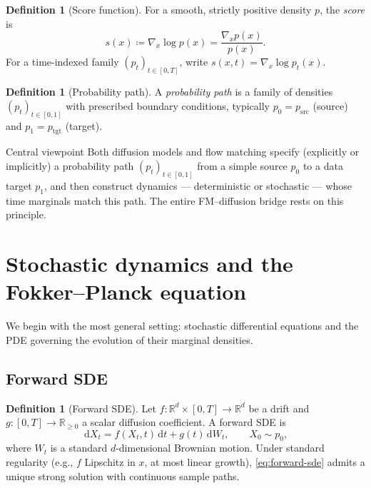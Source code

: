 \documentclass[11pt]{article}
\newcommand{\R}{\mathbb{R}}
\newcommand{\grad}{\nabla}
\newcommand{\dd}{\,\mathrm{d}}
\theoremstyle{definition}
\newtheorem{definition}[theorem]{Definition}
\theoremstyle{remark}
\begin{document}
\begin{definition}[Score function]
For a smooth, strictly positive density $p$, the \emph{score} is
\[
s(x) \coloneqq \grad_x \log p(x) = \frac{\grad_x p(x)}{p(x)}.
\]
For a time-indexed family $(p_t)_{t\in[0,T]}$, write $s(x,t) = \grad_x \log p_t(x)$.
\end{definition}

\begin{definition}[Probability path]
A \emph{probability path} is a family of densities $(p_t)_{t\in[0,1]}$ with prescribed boundary conditions, typically $p_0 = p_{\mathrm{src}}$ (source) and $p_1 = p_{\mathrm{tgt}}$ (target).
\end{definition}

\begin{keybox}{Central viewpoint}
Both diffusion models and flow matching specify (explicitly or implicitly) a probability path $(p_t)_{t\in[0,1]}$ from a simple source $p_0$ to a data target $p_1$, and then construct dynamics --- deterministic or stochastic --- whose time marginals match this path.
The entire FM--diffusion bridge rests on this principle.
\end{keybox}

\section{Stochastic dynamics and the Fokker--Planck equation}\label{sec:sde-fp}

We begin with the most general setting: stochastic differential equations and the PDE governing the evolution of their marginal densities.

\subsection{Forward SDE}

\begin{definition}[Forward SDE]\label{def:forward-sde}
Let $f:\R^d\times[0,T]\to\R^d$ be a drift and $g:[0,T]\to\R_{\ge 0}$ a scalar diffusion coefficient.
A forward SDE is
\begin{equation}\label{eq:forward-sde}
\dd X_t = f(X_t,t)\dd t + g(t)\dd W_t, \qquad X_0 \sim p_0,
\end{equation}
where $W_t$ is a standard $d$-dimensional Brownian motion.
Under standard regularity (e.g., $f$ Lipschitz in $x$, at most linear growth), \eqref{eq:forward-sde} admits a unique strong solution with continuous sample paths.
\end{definition}
\end{document}
